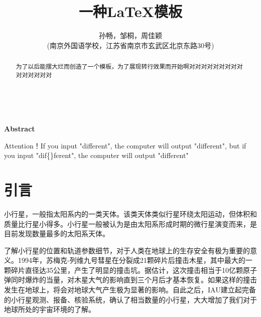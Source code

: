 \documentclass[12pt,a4paper]{article}%
\title{\fontsize{18pt}{27pt}\selectfont%
	{\heiti%
		一种\LaTeX 模板}}%
\author{\fontsize{12pt}{18pt}\selectfont%
	{\fangsong%
		孙畅，邹桐，周佳颖 }\\%
	\fontsize{10.5pt}{15.75pt}\selectfont%
	{\fangsong%
		(南京外国语学校，江苏省南京市玄武区北京东路30号)}}%
\date{}%
\begin{document}
\maketitle%
\lhead{}%
\chead{}%
\rhead{}%
\lfoot{}%
\cfoot{\thepage}%
\rfoot{}%
\begin{abstract}
    \fangsong 为了以后能摆大烂而创造了一个模板，为了展现转行效果而开始啊对对对对对对对对对对对对对对对
\end{abstract}

\begin{adjustwidth}{1.06cm}{1.06cm}
    \fontsize{10.5pt}{15.75pt}\\
\end{adjustwidth}

\begin{center}%
    {\textbf{Abstract}}%
\end{center}
\begin{adjustwidth}{1.06cm}{1.06cm}%
    \hspace{1.5em}Attention！If you input "dif{}ferent", the computer will output "different", but if you input "dif\{\}ferent", the computer will output "dif{}ferent"
\end{adjustwidth}
\newpage%

\tableofcontents

\newpage

\section{引言}

小行星，一般指太阳系内的一类天体。该类天体类似行星环绕太阳运动，但体积和质量比行星小得多。小行星一般被认为是由太阳系形成时期的微行星演变而来，是目前发现数量最多的太阳系天体。

了解小行星的位置和轨道参数细节，对于人类在地球上的生存安全有极为重要的意义。1994年，苏梅克-列维九号彗星在分裂成21颗碎片后撞击木星，其中最大的一颗碎片直径达35公里，产生了明显的撞击坑。据估计，这次撞击相当于10亿颗原子弹同时爆炸的当量，对木星大气的影响直到三个月后才基本恢复。如果这样的撞击发生在地球上，将会对地球大气产生极为显著的影响。自此之后，IAU建立起完备的小行星观测、报备、核验系统，确认了相当数量的小行星，大大增加了我们对于地球所处的宇宙环境的了解。
\end{document}
